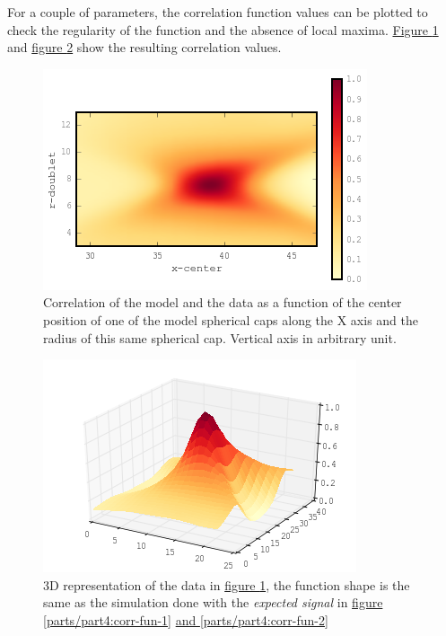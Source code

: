 \documentclass[A4paperpaper,11pt,english]{sphinxmanual}
\begin{document}
For a couple of parameters, the correlation function values can be plotted
to check the regularity of the function and the absence of local maxima. \hyperref[parts/part4:gof2d]{Figure  \ref*{parts/part4:gof2d}} and \hyperref[parts/part4:gof3d]{figure  \ref*{parts/part4:gof3d}} show the resulting correlation values.
\begin{figure}[htbp]
\centering
\capstart

\includegraphics[width=0.600\linewidth]{gof-2d-doublets.png}
\caption{Correlation of the model and the data as a function of the center position
of one of the model spherical caps along the X axis and the radius of this
same spherical cap. Vertical axis in arbitrary unit.}\label{parts/part4:gof2d}\end{figure}
\begin{figure}[htbp]
\centering
\capstart

\includegraphics[width=0.600\linewidth]{gof-3d-doublets.png}
\caption{3D representation of the data in \hyperref[parts/part4:gof2d]{figure  \ref*{parts/part4:gof2d}}, the function shape is the same as the simulation done with the \emph{expected signal} in
\hyperref[parts/part4:corr-fun-1]{figure  \ref*{parts/part4:corr-fun-1}} \hyperref[parts/part4:corr-fun-2]{and  \ref*{parts/part4:corr-fun-2}}}\label{parts/part4:gof3d}\end{figure}
\end{document}
